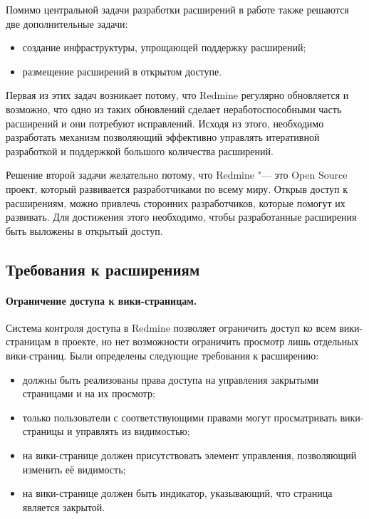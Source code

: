 Помимо центральной задачи разработки расширений в работе также решаются две
дополнительные задачи:
\begin{itemize}
  \item создание инфраструктуры, упрощающей поддержку расширений;
  \item размещение расширений в открытом доступе.
\end{itemize}

Первая из этих задач возникает потому, что Redmine регулярно обновляется и
возможно, что одно из таких обновлений сделает неработоспособными часть
расширений и они потребуют исправлений. Исходя из этого, необходимо разработать
механизм позволяющий эффективно управлять итеративной разработкой и поддержкой
большого количества расширений.

Решение второй задачи желательно потому, что Redmine "--- это Open Source
проект, который развивается разработчиками по всему миру. Открыв доступ к
расширениям, можно привлечь сторонних разработчиков, которые помогут их
развивать. Для достижения этого необходимо, чтобы разработанные расширения быть
выложены в открытый доступ.

\subsection*{Требования к расширениям}

\paragraph{Ограничение доступа к вики-страницам.}
\label{definition:private_wiki}
Система контроля доступа в Redmine позволяет ограничить доступ ко всем
вики-страницам в проекте, но нет возможности ограничить просмотр лишь
отдельных вики-страниц. Были определены следующие требования к расширению:
\begin{itemize}
  \item должны быть реализованы права доступа на управления закрытыми
  страницами и на их просмотр;
  \item только пользователи с соответствующими правами могут просматривать
  вики-страницы и управлять из видимостью;   
  \item на вики-странице должен присутствовать элемент управления, позволяющий
  изменить её видимость;
  \item на вики-странице должен быть индикатор, указывающий, что страница
  является закрытой.
\end{itemize}

